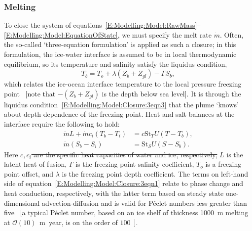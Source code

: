 \documentclass[openacc]{rsproca_new}%
\newcommand{\order}[1]{\mathcal{O}(#1)}
\newcommand{\red}[1]{{\color{red} #1}}
\newcommand{\blue}[1]{{\color{blue} #1}}
\newcommand{\rout}[1]{\red{\st{#1}}}\newcommand{\ab}[1]{\textcolor{Green}{#1}}\newcommand{\about}[1]{\textcolor{Cyan}{\sout{#1}}}
\begin{document}
\begin{table}[!h]
\begin{center}
\begin{tabular}{llll}
\hline
\end{tabular}
\end{center}
\vspace*{-4pt}
\end{table}

\subsubsection{Melting}
To close the system of equations~\eqref{E:Modelling:Model:RawMass}--\eqref{E:Modelling:Model:EquationOfState}, we must specify the melt rate $\dot{m}$.  Often, the so-called `three-equation formulation' is applied as such a closure; in this formulation, the ice-water interface is assumed to be in local thermodynamic equilibrium, so its temperature and salinity satisfy the liquidus condition,
\begin{equation}
    T_b = T_o + \lambda (Z_{b} + Z_{gl}) - \Gamma S_b,\label{E:Modelling:Model:Closure:3eqn3}
\end{equation}
which relates the ice-ocean interface temperature to the local pressure freezing point~\cite{Holland1999JPhysOcean} [note that $-(Z_b + Z_{gl})$ is the depth below sea level]. It is through the liquidus condition~\eqref{E:Modelling:Model:Closure:3eqn3} that the plume `knows' about depth dependence of the freezing point. Heat and salt balances at the interface require the following to hold:
\begin{align}
\dot{m}L + \dot{m}c_i (T_b - T_i) &= c \mathrm{St}_T U(T - T_b),\label{E:Modelling:Model:Closure:3eqn1}\\
\dot{m}(S_b - S_i) &= \mathrm{St}_S U(S - S_b).\label{E:Modelling:Model:Closure:3eqn2}
\end{align}  
Here\rout{ $c, c_i$ are the specific heat capacities of water and ice, respectively,} $L$ is the latent heat of fusion, $\Gamma$ is the freezing point salinity coefficient,  $T_o$ is a freezing point offset, and $\lambda$ is the freezing point depth coefficient. The terms on left-hand side of equation~\eqref{E:Modelling:Model:Closure:3eqn1} relate to phase change and heat conduction, respectively, with the latter term based on steady state one-dimensional advection-diffusion and is valid for P\'{e}clet numbers\rout{ less} \blue{greater} than five~\cite{Holland1999JPhysOcean} \blue{[a typical P\'{e}clet number, based on an ice shelf of thickness 1000~m melting at $\order{10}$~m~year, is on the order of $100$~\cite{Holland1999JPhysOcean}].}
\end{document}
